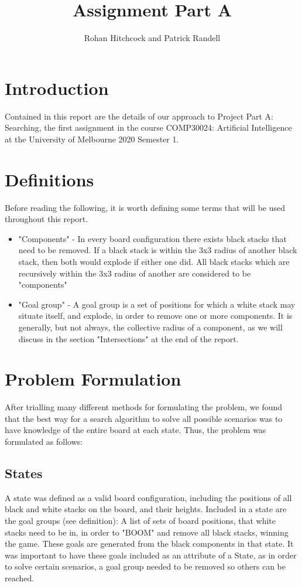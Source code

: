 \documentclass[11pt]{article}
\begin{document}
    \title{\textbf{Assignment Part A}}
    \author{Rohan Hitchcock and Patrick Randell}
    \date{}
    \maketitle
    \section{Introduction}\label{sec:introduction}
    Contained in this report are the details of our approach to Project Part A: Searching, the first assignment in the course
    COMP30024: Artificial Intelligence at the University of Melbourne 2020 Semester 1.
    \section{Definitions}\label{sec:definitions}
    Before reading the following, it is worth defining some terms that will be used throughout this report.
    \begin{itemize}
        \item "Components" - In every board configuration there exists black stacks that need to be removed.
        If a black stack is within the 3x3 radius of another black stack, then both would explode if either one did.
        All black stacks which are recursively within the 3x3 radius of another are considered to be "components"
        \item "Goal group" - A goal group is a set of positions for which a white stack may situate itself, and explode,
        in order to remove one or more components.
        It is generally, but not always, the collective radius of a component, as we will discuss in the section "Intersections"
        at the end of the report.
    \end{itemize}

    \section{Problem Formulation}\label{sec:problem-formulation}
    After trialling many different methods for formulating the problem, we found that the best way for a search
    algorithm to solve all possible scenarios was to have knowledge of the entire board at each state.
    Thus, the problem was formulated as follows:
    \subsection{States}\label{subsec:states}
    A state was defined as a valid board configuration, including the positions of all black and white stacks on the board, and
    their heights.
    Included in a state are the goal groups (see definition): A list of sets of board positions, that white stacks
    need to be in, in order to "BOOM" and remove all black stacks, winning the game.
    These goals are generated from the black components in that state.
    It was important to have these goals included as an attribute of a State, as in order to solve certain scenarios,
    a goal group needed to be removed so others can be reached.
\end{document}
